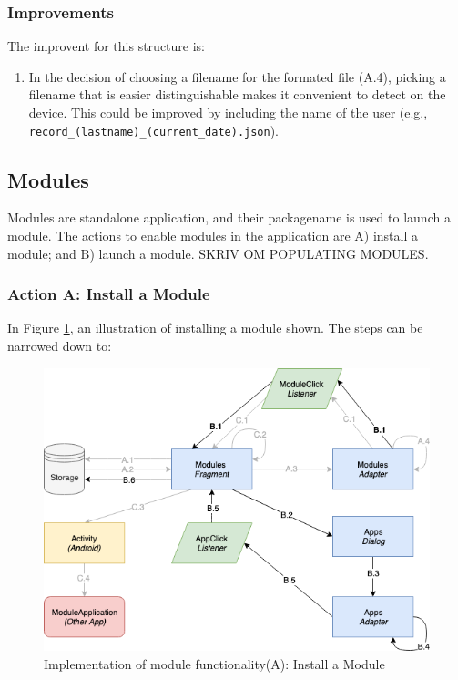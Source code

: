 \subsubsection{Improvements}
The improvent for this structure is:
\begin{enumerate}
    \item In the decision of choosing a filename for the formated file (A.4), picking a filename that is easier distinguishable makes it convenient to detect on the device. This could be improved by including the name of the user (e.g., \verb|record_(lastname)_(current_date).json|).
\end{enumerate}

\subsection{Modules}
Modules are standalone application, and their packagename is used to launch a module. The actions to enable modules in the application are A) install a module; and B) launch a module. SKRIV OM POPULATING MODULES. 

\subsubsection{Action A: Install a Module}
In Figure \ref{fig:impl_modulesB}, an illustration of installing a module shown. The steps can be narrowed down to:

\begin{figure}
    \centering
    \includegraphics[scale=0.6]{images/Module_ImpB.png}
    \caption{Implementation of module functionality(A): Install a Module}
    \label{fig:impl_modulesB}
\end{figure}

